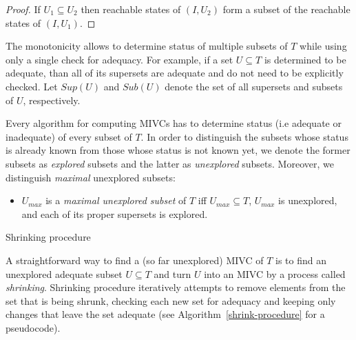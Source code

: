 \begin{proof}
If $U_1 \subseteq U_2$ then reachable states of $(I, U_2)$ form  a subset of the reachable states
of $(I, U_1)$.
\end{proof}
%


The monotonicity allows  to determine status  of multiple subsets of $T$ while using only a single check for adequacy. For example, if a set $U \subseteq T$ is determined to be adequate, than all of its supersets are   adequate and do not need to be explicitly checked. Let     $\mathit{Sup}(U)$ and $\mathit{Sub}(U)$ denote the set of all supersets and subsets of $U$, respectively.

Every algorithm for computing MIVCs has to determine status (i.e adequate or inadequate) of every subset of $T$.  In order to distinguish the subsets whose status is already known from those whose status is not known yet, we denote the former subsets as \emph{explored} subsets and the latter as \emph{unexplored} subsets. Moreover, we distinguish \emph{maximal} unexplored subsets:
\begin{itemize}
	\item $U_{max}$ is a \emph{maximal unexplored subset} of $T$ iff $U_{max} \subseteq T$, $U_{max}$ is unexplored, and each of its proper supersets is explored.
\end{itemize}



\begin{algorithm}[!t]\label{shrink-procedure}

\caption{Shrinking procedure }
\end{algorithm}


A straightforward way to find a (so far unexplored) MIVC of $T$ is to find an unexplored adequate subset $U \subseteq T$ and turn $U$  into an MIVC by a process called \emph{shrinking}. Shrinking procedure iteratively attempts to remove elements from the set that is being shrunk, checking each new set for adequacy and keeping only changes that
leave the set adequate (see Algorithm~\ref{shrink-procedure} for a pseudocode).

